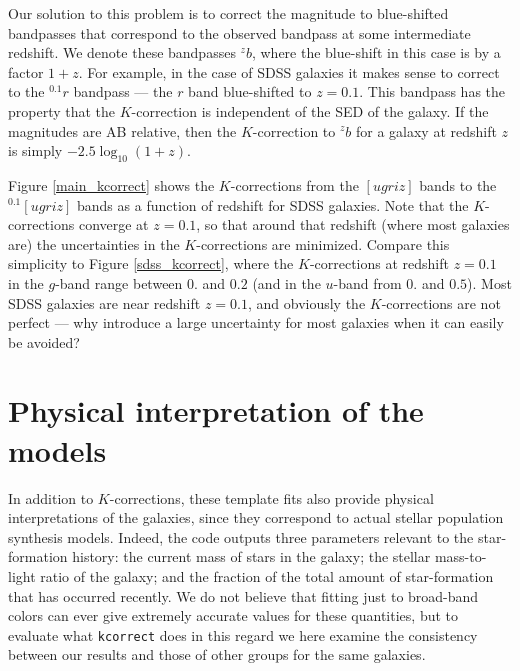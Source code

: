 \documentclass[10pt,preprint]{aastex}
\newcommand{\band}[2]{\ensuremath{^{{#1}}\!{#2}}}
\begin{document}
Our solution to this problem is to correct the magnitude to
blue-shifted bandpasses that correspond to the observed bandpass at
some intermediate redshift. We denote these bandpasses \band{z}{b},
where the blue-shift in this case is by a factor $1+z$. For example,
in the case of SDSS galaxies it makes sense to correct to the
\band{0.1}{r} bandpass --- the $r$ band blue-shifted to $z=0.1$. This
bandpass has the property that the $K$-correction is independent of
the SED of the galaxy. If the magnitudes are AB relative, then the
$K$-correction to \band{z}{b} for a galaxy at redshift $z$ is simply
$-2.5\log_{10} (1+z)$.

Figure \ref{main_kcorrect} shows the $K$-corrections from the
$[ugriz]$ bands to the $\band{0.1}{[ugriz]}$ bands as a function of
redshift for SDSS galaxies. Note that the $K$-corrections converge at
$z=0.1$, so that around that redshift (where most galaxies are) the
uncertainties in the $K$-corrections are minimized. Compare this
simplicity to Figure \ref{sdss_kcorrect}, where the $K$-corrections at
redshift $z=0.1$ in the $g$-band range between $0.$ and $0.2$ (and in
the $u$-band from $0.$ and $0.5$). Most SDSS galaxies are near
redshift $z=0.1$, and obviously the $K$-corrections are not perfect
--- why introduce a large uncertainty for most galaxies when it can
easily be avoided?

\section{Physical interpretation of the models}
\label{physical}

In addition to $K$-corrections, these template fits also provide
physical interpretations of the galaxies, since they correspond to
actual stellar population synthesis models. Indeed, the code outputs
three parameters relevant to the star-formation history: the current
mass of stars in the galaxy; the stellar mass-to-light ratio of the
galaxy; and the fraction of the total amount of star-formation that
has occurred recently. We do not believe that fitting just to
broad-band colors can ever give extremely accurate values for these
quantities, but to evaluate what {\tt kcorrect} does in this regard we
here examine the consistency between our results and those of other
groups for the same galaxies.
\end{document}
